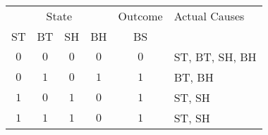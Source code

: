 \begin{tabular}{cccccl}
\toprule
\multicolumn{4}{c}{State} & Outcome & Actual Causes \\ \cmidrule(lr){1-4}
ST & BT & SH & BH & BS &  \\
\midrule
$0$ & $0$ & $0$ & $0$ & $0$ & ST, BT, SH, BH \\
$0$ & $1$ & $0$ & $1$ & $1$ & BT, BH \\
$1$ & $0$ & $1$ & $0$ & $1$ & ST, SH \\
$1$ & $1$ & $1$ & $0$ & $1$ & ST, SH \\
\bottomrule
\end{tabular}
